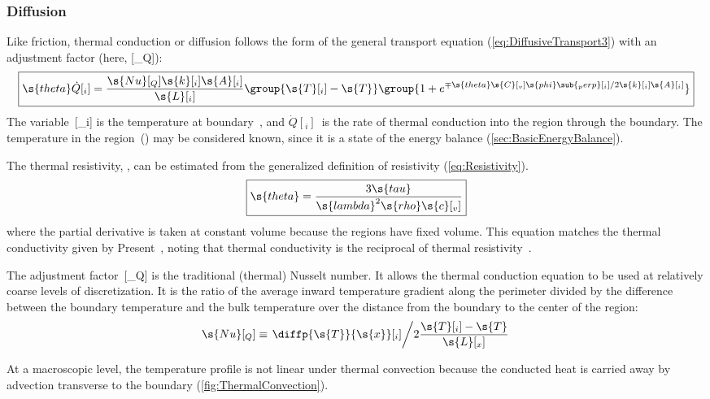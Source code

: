 \subsubsection{Diffusion}

Like friction, thermal conduction or diffusion follows the form of the general transport equation (\ref{eq:DiffusiveTransport3}) with an adjustment factor (here, [_Q]):
\begin{equation}
  \label{eq:ThermalDiffusiveTransport}
  \boxed{\s{theta}\dot{Q}[_i] = \frac{\s{Nu}[_Q]\s{k}[_i]\s{A}[_i]}{\s{L}[_i]}\group{\s{T}[_i] - \s{T}}\group{1 + e^{\mp\s{theta}\s{C}[_v]\s{phi}\sub{_perp}[_i]/2\s{k}[_i]\s{A}[_i]}}}
\end{equation}
The variable~[_i] is the temperature at boundary~, and $\dot{Q}[_i]$~is the rate of thermal conduction into the region through the boundary.  The temperature in the region~() may be considered known, since it is a state of the energy balance (\autoref{sec:BasicEnergyBalance}).

The thermal resistivity, , can be estimated from the generalized definition of resistivity (\autoref{eq:Resistivity}).
\begin{equation}
  \label{eq:ThermalResistivity}
  \boxed{\s{theta} = \frac{3\s{tau}}{\s{lambda}^2\s{rho}\s{c}[_v]}}
\end{equation}
where the partial derivative is taken at constant volume because the regions have fixed volume.  This equation matches the thermal conductivity given by Present~\cite{Present1958}, noting that thermal conductivity is the reciprocal of thermal resistivity~\cite{Incropera2002}.

The adjustment factor~[_Q] is the traditional (thermal) Nusselt number\label{mark:Nusselt}.   It allows the thermal conduction equation to be used at relatively coarse levels of discretization.  It is the ratio of the average inward temperature gradient along the perimeter divided by the difference between the boundary temperature and the bulk temperature over the distance from the boundary to the center of the region:
\begin{equation}
  \label{eq:ThermalNusselt}
  \s{Nu}[_Q] \equiv \left.\diffp{\s{T}}{\s{x}}[_i]\middle/2\frac{\s{T}[_i] - \s{T}}{\s{L}[_x]}\right.
\end{equation}

At a macroscopic level, the temperature profile is not linear under thermal convection because the conducted heat is carried away by advection transverse to the boundary (\autoref{fig:ThermalConvection}).


